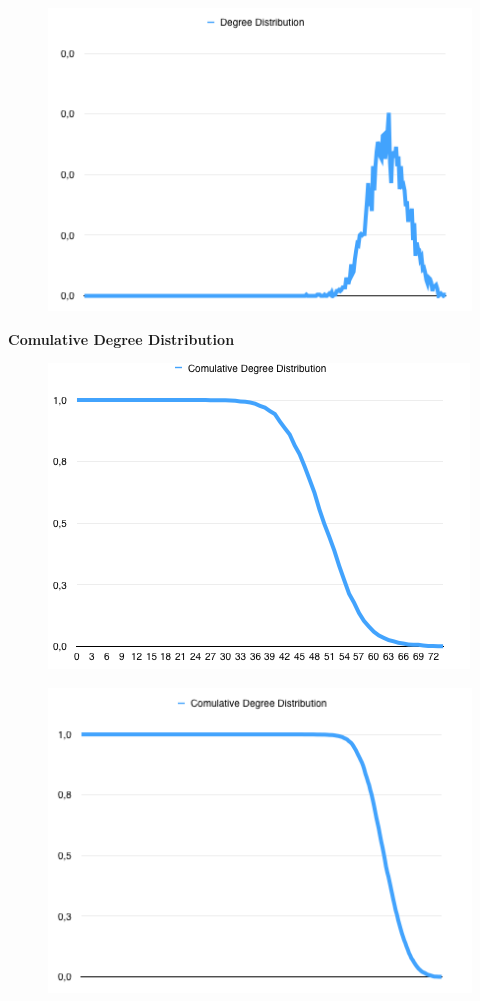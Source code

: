 \documentclass[a4paper,titlepage,11pt]{article}
\begin{document}
\begin{figure}[h]
    \centering
    \includegraphics[scale=0.50]{img/dd-5000-0.05.png}
\end{figure}

\textbf{Comulative Degree Distribution}

\begin{figure}[h]
    \centering
    \includegraphics[scale=0.50]{img/cdd-1000-0.05.png}
\end{figure}

\begin{figure}[h]
    \centering
    \includegraphics[scale=0.50]{img/cdd-5000-0.05.png}
\end{figure}
\end{document}
